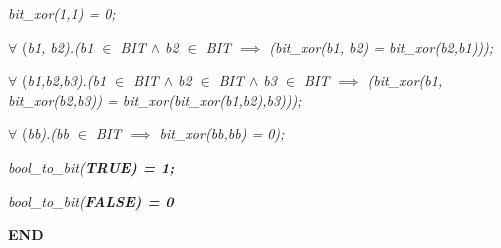 \begin{sloppypar}
\hspace*{0.20in}\it bit\_xor\rm (\rm 1\rm ,\rm 1\rm ) \rm = \rm 0\rm ;

\hspace*{0.20in} $\forall$ \rm (\it b1\rm , \it b2\rm )\rm .\rm (\it b1  $\in$  \it BIT  $\land$  \it b2  $\in$  \it BIT  $\implies$  \rm (\it bit\_xor\rm (\it b1\rm , \it b2\rm ) \rm = \it bit\_xor\rm (\it b2\rm ,\it b1\rm )\rm )\rm )\rm ;

\hspace*{0.20in} $\forall$ \rm (\it b1\rm ,\it b2\rm ,\it b3\rm )\rm .\rm (\it b1  $\in$  \it BIT  $\land$  \it b2  $\in$  \it BIT  $\land$  \it b3  $\in$  \it BIT  $\implies$  \rm (\it bit\_xor\rm (\it b1\rm , \it bit\_xor\rm (\it b2\rm ,\it b3\rm )\rm ) \rm = \it bit\_xor\rm (\it bit\_xor\rm (\it b1\rm ,\it b2\rm )\rm ,\it b3\rm )\rm )\rm )\rm ;

\hspace*{0.20in} $\forall$ \rm (\it bb\rm )\rm .\rm (\it bb  $\in$  \it BIT  $\implies$  \it bit\_xor\rm (\it bb\rm ,\it bb\rm ) \rm = \rm 0\rm )\rm ;

\vspace*{4mm}
\hspace*{0.20in}\it bool\_to\_bit\rm (\bf TRUE\rm ) \rm = \rm 1\rm ;

\hspace*{0.20in}\it bool\_to\_bit\rm (\bf FALSE\rm ) \rm = \rm 0

\vspace*{4mm}
\bf END\newpage
\end{sloppypar}
